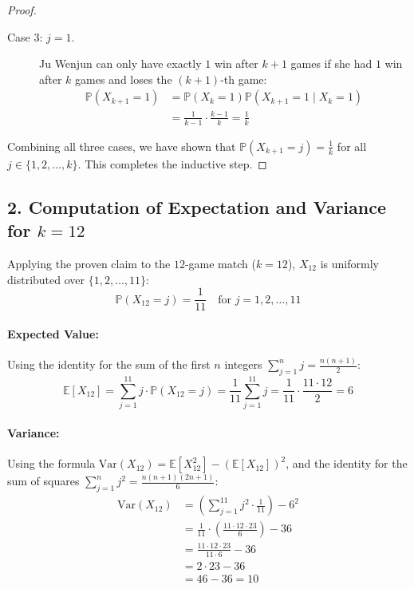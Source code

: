 \documentclass[a4paper,12pt]{article}
\begin{document}
\begin{proof}
\begin{description}
    \item[Case 3: $j = 1$.]
    Ju Wenjun can only have exactly $1$ win after $k+1$ games if she had $1$ win after $k$ games and loses the $(k+1)$-th game:
    \begin{align*}
        \mathbb{P}(X_{k+1} = 1) &= \mathbb{P}(X_k = 1)\mathbb{P}(X_{k+1} = 1 \mid X_k = 1) \\
        &= \frac{1}{k-1} \cdot \frac{k-1}{k} = \frac{1}{k}
    \end{align*}
\end{description}

Combining all three cases, we have shown that $\mathbb{P}(X_{k+1} = j) = \frac{1}{k}$ for all $j \in \{1, 2, \dots, k\}$. This completes the inductive step.
\end{proof}

\subsection*{2. Computation of Expectation and Variance for $k=12$}

Applying the proven claim to the $12$-game match ($k = 12$), $X_{12}$ is uniformly distributed over $\{1, 2, \dots, 11\}$:
\[
\mathbb{P}(X_{12} = j) = \frac{1}{11} \quad \text{for } j = 1, 2, \dots, 11
\]

\paragraph{Expected Value:}
Using the identity for the sum of the first $n$ integers $\sum_{j=1}^n j = \frac{n(n+1)}{2}$:
\[
\mathbb{E}[X_{12}] = \sum_{j=1}^{11} j \cdot \mathbb{P}(X_{12} = j) = \frac{1}{11} \sum_{j=1}^{11} j = \frac{1}{11} \cdot \frac{11 \cdot 12}{2} = 6
\]

\paragraph{Variance:}
Using the formula $\text{Var}(X_{12}) = \mathbb{E}[X_{12}^2] - (\mathbb{E}[X_{12}])^2$, and the identity for the sum of squares $\sum_{j=1}^n j^2 = \frac{n(n+1)(2n+1)}{6}$:
\begin{align*}
    \text{Var}(X_{12}) &= \left( \sum_{j=1}^{11} j^2 \cdot \frac{1}{11} \right) - 6^2 \\
    &= \frac{1}{11} \cdot \left( \frac{11 \cdot 12 \cdot 23}{6} \right) - 36 \\
    &= \frac{11 \cdot 12 \cdot 23}{11 \cdot 6} - 36 \\
    &= 2 \cdot 23 - 36 \\
    &= 46 - 36 = 10
\end{align*}
\end{document}
